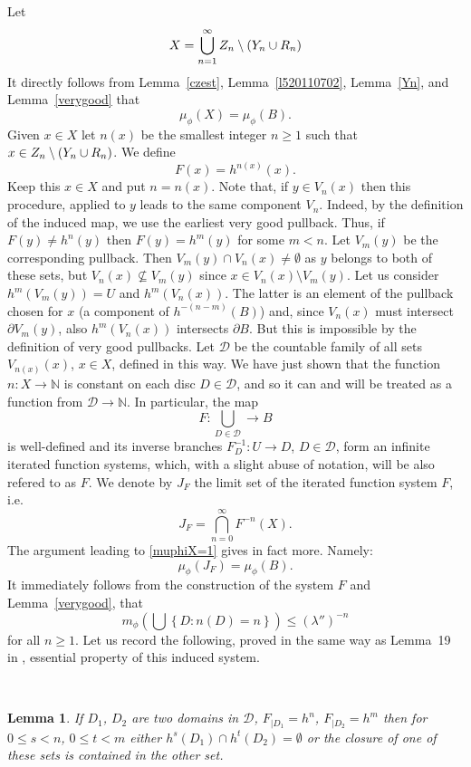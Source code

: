 \documentclass[12pt]{amsart}
\numberwithin{equation}{section}
\newcommand{\beq}{\begin{equation}}
\newcommand{\eeq}{\end{equation}}
\newcommand{\nl}{\newline}
\newtheorem{lem}[thm]{Lemma}
\def\N{{\mathbb N}}            \def\Z{{\mathbb Z}}      \def\R{{\mathbb R}}
\def\bi{\bigcap}              \def\bu{\bigcup}
\def\lt{\left}                \def\rt{\right}
\def\sp{\medskip}             \def\fr{\noindent}        \def\nl{\newline}
\newcommand{\lam}{\lambda}
\begin{document}
\sp\fr Let 
$$
X=\bu_{n=1}^\infty Z_n\sms(Y_n\cup R_n)
$$
It directly follows from Lemma~\ref{czest}, Lemma~\ref{l520110702},
Lemma~\ref{Yn}, and Lemma~\ref{verygood} that 
\beq\label{muphiX=1}
\mu_\phi(X)=\mu_\phi(B).
\eeq
Given $x\in X$ let $n(x)$ be the smallest integer $n\ge 1$ such that
$x\in Z_n\setminus(Y_n\cup R_n)$. We define
$$
F(x)=h^{n(x)}(x).
$$ 
Keep this $x\in X$ and put $n=n(x)$. Note that, if $y\in V_n(x)$
then this procedure, applied to $y$ leads to the same component
$V_n$. 
Indeed, by the definition of the induced map, we use the earliest very
good pullback. Thus, if $F(y)\neq h^n(y)$ then $F(y)=h^m(y)$ for some
$m<n$. Let $V_m(y)$ be the corresponding pullback. Then $V_m(y)\cap
V_n(x)\neq\emptyset$ as $y$ belongs to both of these sets, but
$V_n(x)\nsubseteq V_m(y)$ since $x\in V_n(x)\setminus V_m(y)$.  
 Let us consider $h^m( V_m(y))=U$ and $h^m(V_n(x))$. The latter is
an element of the pullback chosen for $x$ (a component of
$h^{-(n-m)}(B)$) and, since  $V_n(x)$ must intersect $\partial V_m(y)$, 
also $h^m(V_n(x))$ intersects $\partial B$. But this is impossible by
the definition of very good pullbacks. Let $\mathcal D$ 
be the countable family of all sets $V_{n(x)}(x)$, $x\in X$, defined in this
way. We have just shown that the function $n:X\to\N$ is constant on
each disc $D\in \mathcal D$, and so it can and will be treated as a
function from $\mathcal D\to\N$. In particular, the map  
$$
F:\bigcup_{D\in\mathcal D}\to B
$$
is well-defined and its inverse branches $F_D^{-1}:U\to D$,
$D\in\mathcal D$, form an infinite iterated function
systems, which, with a slight abuse of notation, will be also refered
to as $F$. We denote by $J_F$ the limit set of the iterated function
system $F$, i.e.
\beq\label{limisetIFS}
J_F=\bi_{n=0}^\infty F^{-n}(X).
\eeq
The argument leading to \eqref{muphiX=1} gives in fact more. Namely:
\beq\label{fullmeasurelimisetIFS}
\mu_\phi(J_F)=\mu_\phi(B).
\eeq    
It immediately follows from the construction of the system $F$ and
Lemma~\ref{verygood}, that
\begin{equation}\label{expdecay20110622}
m_\phi\lt(\bu\lt\{D:n(D)=n\rt\}\rt)\le (\lam'')^{-n}
\end{equation}
for all $n\ge 1$.
Let us record the following, proved in the same way as Lemma~19 in
\cite{SUZ1}, essential property of this induced system. 

\

\begin{lem}
If $D_1$, $D_2$ are two domains in $\mathcal D$, $F_{|D_1}=h^n$,
$F_{|D_2}=h^m$ then for $0\le s< n$, $0\le t< m$ either ${h^s(D_1)}\cap
{h^t(D_2)}=\emptyset$ or the closure of one 
of these sets is contained in the other set. 
\end{lem}
\end{document}

